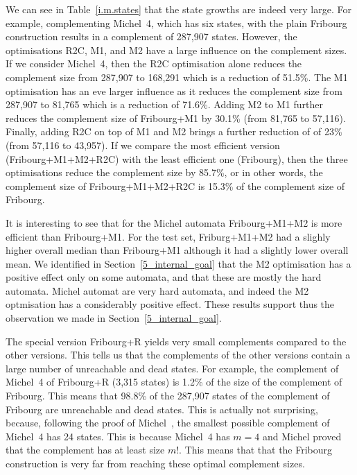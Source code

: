We can see in Table~\ref{i.m.states} that the state growths are indeed very large. For example, complementing Michel~4, which has six states, with the plain Fribourg construction results in a complement of 287,907 states. However, the optimisations R2C, M1, and M2 have a large influence on the complement sizes. If we consider Michel~4, then the R2C optimisation alone reduces the complement size from 287,907 to 168,291 which is a reduction of 51.5\%. The M1 optimisation has an eve larger influence as it reduces the complement size from 287,907 to 81,765 which is a reduction of 71.6\%. Adding M2 to M1 further reduces the complement size of Fribourg+M1 by 30.1\% (from 81,765 to 57,116). Finally, adding R2C on top of M1 and M2 brings a further reduction of of 23\% (from 57,116 to 43,957). If we compare the most efficient version (Fribourg+M1+M2+R2C) with the least efficient one (Fribourg), then the three optimisations reduce the complement size by 85.7\%, or in other words, the complement size of Fribourg+M1+M2+R2C is 15.3\% of the complement size of Fribourg.

It is interesting to see that for the Michel automata Fribourg+M1+M2 is more efficient than Fribourg+M1. For the \goal{} test set, Friburg+M1+M2 had a slighly higher overall median than Fribourg+M1 although it had a slightly lower overall mean. We identified in Section~\ref{5_internal_goal} that the M2 optimisation has a positive effect only on some automata, and that these are mostly the hard automata. Michel automat are very hard automata, and indeed the M2 optmisation has a considerably positive effect. These results support thus the observation we made in Section~\ref{5_internal_goal}.

The special version Fribourg+R yields very small complements compared to the other versions. This tells us that the complements of the other versions contain a large number of unreachable and dead states. For example, the complement of Michel~4 of Fribourg+R (3,315 states) is 1.2\% of the size of the complement of Fribourg. This means that 98.8\% of the 287,907 states of the complement of Fribourg are unreachable and dead states. This is actually not surprising, because, following the proof of Michel~\cite{michel1988}\cite{1996_thomas}, the smallest possible complement of Michel~4 has 24 states. This is because Michel~4 has $m=4$ and Michel proved that the complement has at least size $m!$. This means that that the Fribourg construction is very far from reaching these optimal complement sizes.

